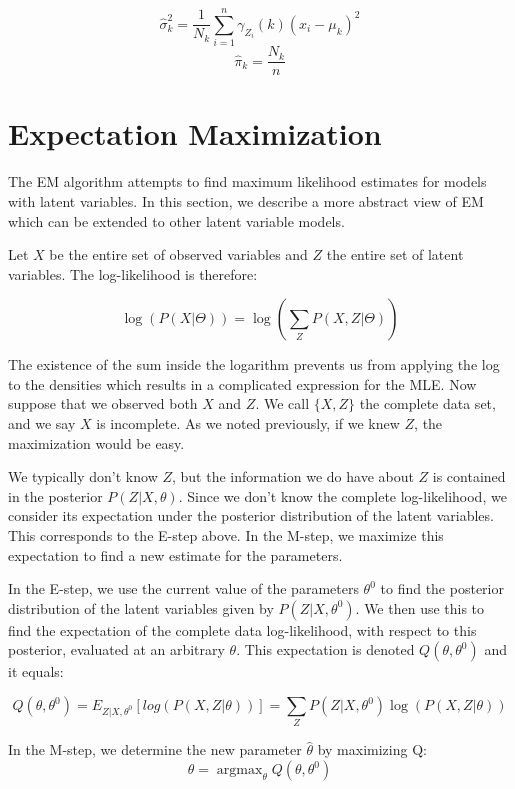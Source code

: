 \documentclass{article}
\DeclareMathOperator*{\argmax}{argmax}
\begin{document}
\[
\hat{\sigma}^{2}_{k} = \frac{1}{N_k} \sum_{i=1}^{n} \gamma_{Z_i} (k) (x_i - \mu_k)^2
\]
\[
\hat{\pi}_{k} = \frac{N_k}{n}
\]

\section{Expectation Maximization}
The EM algorithm attempts to find maximum likelihood estimates for models with latent variables. In this section, we describe a more abstract view of EM which can be extended to other latent variable models.

Let $X$ be the entire set of observed variables and $Z$ the entire set of latent variables. The log-likelihood is therefore:

\[ 
\log {(P(X|\Theta))} = \log \left( {\sum_Z P(X, Z |\Theta)} \right)
\]

The existence of the sum inside the logarithm prevents us from applying the log to the densities which results in a complicated expression for the MLE. Now suppose that we observed both $X$ and $Z$. We call $\{X,Z\}$ the complete data set, and we say $X$ is incomplete. As we noted previously, if we knew $Z$, the maximization would be easy.

We typically don't know $Z$, but the information we do have about $Z$ is contained in the posterior $P(Z|X,\theta)$. Since we don't know the complete log-likelihood, we consider its expectation under the posterior distribution of the latent variables. This corresponds to the E-step above. In the M-step, we maximize this expectation to find a new estimate for the parameters.

In the E-step, we use the current value of the parameters $\theta^0$ to find the posterior distribution of the latent variables given by $P(Z|X,\theta^0)$. We then use this to find the expectation of the complete data log-likelihood, with respect to this posterior, evaluated at an arbitrary $\theta$. This expectation is denoted $Q(\theta,\theta^0)$ and it equals:

\[ 
Q(\theta, \theta^0) = E_{Z | X, \theta^0} [log(P(X,Z|\theta))] = \sum_Z P(Z | X, \theta^0) \log(P(X,Z|\theta))
\]

In the M-step, we determine the new parameter $\hat{\theta}$ by maximizing Q:
\[
\hat{\theta} =  \argmax_{\theta} Q(\theta, \theta^0) 
\]

\end{document}
